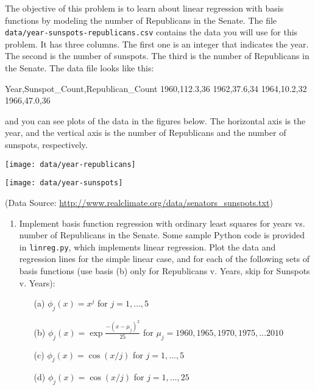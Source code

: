 \documentclass[submit]{harvardml}
\begin{document}
\begin{problem}
  
 The objective of this problem is to learn about linear regression
 with basis functions by modeling the number of Republicans in the
 Senate. The file \verb|data/year-sunspots-republicans.csv| contains the
 data you will use for this problem.  It has three columns.  The first
 one is an integer that indicates the year.  The second is the number
 of sunspots.  The third is the number of Republicans in the Senate.
 The data file looks like this:
 \begin{csv}
Year,Sunspot_Count,Republican_Count
1960,112.3,36
1962,37.6,34
1964,10.2,32
1966,47.0,36
\end{csv}
and you can see plots of the data in the figures below.  The horizontal axis is the year, and the vertical axis is the number of Republicans and the number of sunspots, respectively.

\begin{center}
\texttt{[image: data/year-republicans]}
\end{center}

\begin{center}
\texttt{[image: data/year-sunspots]}
\end{center}

(Data Source: \url{http://www.realclimate.org/data/senators_sunspots.txt})\\

\begin{enumerate}

\item Implement basis function regression with ordinary least squares for
years vs. number of Republicans in the Senate. Some sample Python code
is provided in \verb|linreg.py|, which implements linear regression.
Plot the data and regression lines for the simple linear case, and for
each of the following sets of basis functions (use basis (b) only for Republicans v. Years, skip for Sunspots v. Years):
\begin{enumerate}
	\item[(a)] $\phi_j(x) = x^j$ for $j=1, \ldots, 5$ 
    \item[(b)] $\phi_j(x) = \exp{\frac{-(x-\mu_j)^2}{25}}$ for $\mu_j=1960, 1965, 1970, 1975, \ldots 2010$
	\item[(c)] $\phi_j(x) = \cos(x / j)$ for $j=1, \ldots, 5$
	\item[(d)] $\phi_j(x) = \cos(x / j)$ for $j=1, \ldots, 25$
\end{enumerate}


\end{enumerate}
\end{problem}
\end{document}
